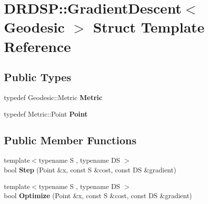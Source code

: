 \hypertarget{struct_d_r_d_s_p_1_1_gradient_descent}{\section{D\-R\-D\-S\-P\-:\-:Gradient\-Descent$<$ Geodesic $>$ Struct Template Reference}
\label{struct_d_r_d_s_p_1_1_gradient_descent}
}
\subsection*{Public Types}
\begin{DoxyCompactItemize}
\item 
\hypertarget{struct_d_r_d_s_p_1_1_gradient_descent_a0534fdca2e58308db1766b72510da64a}{typedef Geodesic\-::\-Metric {\bfseries Metric}}\label{struct_d_r_d_s_p_1_1_gradient_descent_a0534fdca2e58308db1766b72510da64a}

\item 
\hypertarget{struct_d_r_d_s_p_1_1_gradient_descent_a35bcc6491682744ad9720510a1d13ecb}{typedef Metric\-::\-Point {\bfseries Point}}\label{struct_d_r_d_s_p_1_1_gradient_descent_a35bcc6491682744ad9720510a1d13ecb}

\end{DoxyCompactItemize}
\subsection*{Public Member Functions}
\begin{DoxyCompactItemize}
\item 
\hypertarget{struct_d_r_d_s_p_1_1_gradient_descent_a826130f2adf7029ab248d9fc4d70d224}{{\footnotesize template$<$typename S , typename D\-S $>$ }\\bool {\bfseries Step} (Point \&x, const S \&cost, const D\-S \&gradient)}\label{struct_d_r_d_s_p_1_1_gradient_descent_a826130f2adf7029ab248d9fc4d70d224}

\item 
\hypertarget{struct_d_r_d_s_p_1_1_gradient_descent_aef8ad1b92b8fefa8f67072f052dfb042}{{\footnotesize template$<$typename S , typename D\-S $>$ }\\bool {\bfseries Optimize} (Point \&x, const S \&cost, const D\-S \&gradient)}\label{struct_d_r_d_s_p_1_1_gradient_descent_aef8ad1b92b8fefa8f67072f052dfb042}

\end{DoxyCompactItemize}
